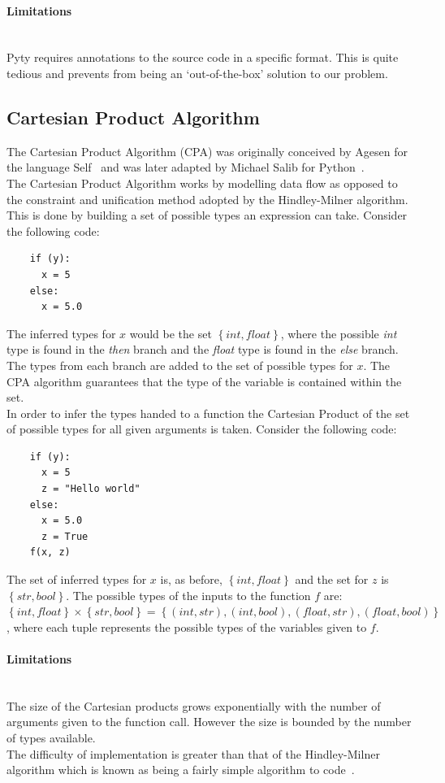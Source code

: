 \documentclass[12pt, titlepage]{article}
\begin{document}
\paragraph{Limitations}\mbox{}\\
Pyty requires annotations to the source code in a specific format. This is quite tedious and prevents from being an `out-of-the-box' solution to our problem.

\subsection{Cartesian Product Algorithm}
The Cartesian Product Algorithm (CPA) was originally conceived by Agesen for the language Self~\cite{agesen95} and was later adapted by Michael Salib for Python~\cite{starkiller}. \\
The Cartesian Product Algorithm works by modelling data flow as opposed to the constraint and unification method adopted by the Hindley-Milner algorithm. This is done by building a set of possible types an expression can take. Consider the following code:
\begin{lstlisting}
	if (y):	
      x = 5     
	else:
	  x = 5.0  
\end{lstlisting}
The inferred types for $x$ would be the set $\left\{ {int, float}\right\}$, where the possible \textit{int} type is found in the \textit{then} branch and the \textit{float} type is found in the \textit{else} branch. The types from each branch are added to the set of possible types for $x$. The CPA algorithm guarantees that the type of the variable is contained within the set. \\
In order to infer the types handed to a function the Cartesian Product of the set of possible types for all given arguments is taken. Consider the following code:
\begin{lstlisting}
	if (y):	
	  x = 5 
	  z = "Hello world"    
	else:
	  x = 5.0 
	  z = True
	f(x, z)
\end{lstlisting}
The set of inferred types for $x$ is, as before, $\left\{ {int, float}\right\}$ and the set for $z$ is $\left\{ {str, bool}\right\}$. The possible types of the inputs to the function $f$ are: $\left\{ {int, float}\right\} \times \left\{ {str, bool}\right\} = \left\{ {(int, str), (int, bool), (float, str), (float, bool)}\right\}$, where each tuple represents the possible types of the variables given to $f$.
\paragraph*{Limitations}\mbox{}\\
The size of the Cartesian products grows exponentially with the number of arguments given to the function call. However the size is bounded by the number of types available. \\
The difficulty of implementation is greater than that of the Hindley-Milner algorithm which is known as being a fairly simple algorithm to code~\cite{jones95}.
\end{document}
